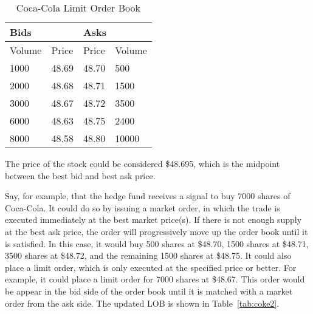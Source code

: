 \begin{table}[htbp]
\caption{Coca-Cola Limit Order Book} \label{tab:coke1}
\begin{center}
\begin{tabular}{ll|ll}
\hline \hline
\multicolumn{2}{l|}{\textbf{Bids}} & \multicolumn{2}{l}{\textbf{Asks}} \\
\hline
Volume           & Price          & Price           & Volume          \\
\hline
1000             & 48.69          & 48.70           & 500             \\
2000             & 48.68          & 48.71           & 1500            \\
3000             & 48.67          & 48.72           & 3500            \\
6000             & 48.63          & 48.75           & 2400            \\
8000             & 48.58          & 48.80           & 10000          
\end{tabular}
\end{center}
\end{table}

The price of the stock could be considered \$48.695, which is the midpoint between the best bid and best ask price. 

Say, for example, that the hedge fund receives a signal to buy 7000 shares of Coca-Cola. It could do so by issuing a market order, in which the trade is executed immediately at the best market price(s). If there is not enough supply at the best ask price, the order will progressively move up the order book until it is satisfied. In this case, it would buy 500 shares at \$48.70, 1500 shares at \$48.71, 3500 shares at \$48.72, and the remaining 1500 shares at \$48.75. It could also place a limit order, which is only executed at the specified price or better. For example, it could place a limit order for 7000 shares at \$48.67. This order would be appear in the bid side of the order book until it is matched with a market order from the ask side. The updated LOB is shown in Table~\ref{tab:coke2}.

